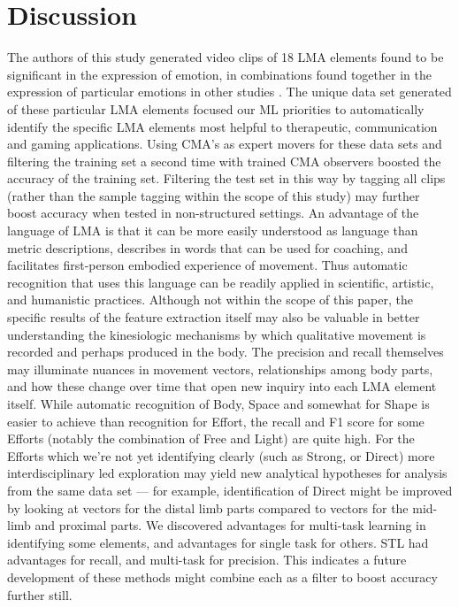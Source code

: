 \documentclass{sigchi}
\begin{document}
\section{Discussion}
The authors of this study generated video clips of 18 LMA elements 
found to be significant in the expression of emotion, in combinations 
found together in the expression of particular emotions in other studies
\cite{Tsachor}.
The unique data set generated of these particular LMA elements focused our ML 
priorities to automatically identify the specific LMA elements most helpful to therapeutic, 
communication and gaming applications.   Using CMA's as expert movers for these data sets 
and filtering the training set a second time with trained CMA observers boosted the accuracy of the 
training set.   Filtering the test set in this way by tagging all clips (rather than the sample
tagging within the scope of this study) may further boost  accuracy when tested in non-structured settings.
An advantage of the language of LMA is that it can be more easily understood as language  than metric 
descriptions, describes in words that can be used for coaching, and facilitates first-person 
embodied experience of movement. Thus automatic recognition that uses this language can be readily 
applied in scientific, artistic, and humanistic practices.
Although not within the scope of this paper, the specific results of the feature extraction 
itself may also be valuable in better understanding the kinesiologic mechanisms by which qualitative 
movement is recorded and perhaps produced in the body.   
The precision and recall themselves may illuminate nuances in movement vectors, relationships among 
body parts, and how these change over time that open new inquiry into each LMA element itself. 
While automatic recognition of Body, Space and somewhat for Shape is easier to achieve than recognition
 for Effort, the recall and F1 score for some Efforts (notably the combination of Free and Light) 
 are quite high.  For the Efforts which we're not yet identifying clearly (such
 as Strong, or Direct) more interdisciplinary led exploration may yield new analytical hypotheses for analysis from the 
 same data set --- for example, identification of Direct might be improved
 by looking at vectors for the distal limb parts compared to vectors for the mid-limb and proximal parts. 
We discovered advantages for multi-task learning in identifying some elements, and advantages for 
single task for others. STL had advantages for recall, and multi-task for precision. This indicates 
a future development of these methods might combine each as a filter to boost accuracy further still.
\end{document}
